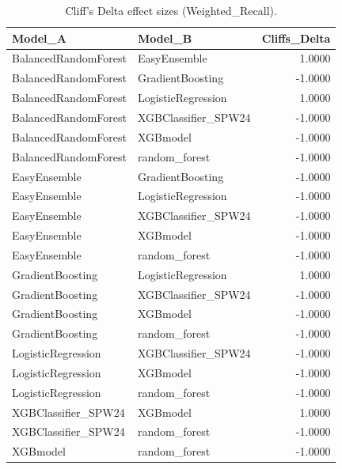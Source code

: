 \begin{table}[t]
\centering
\begin{tabular}{llr}
\toprule
Model_A & Model_B & Cliffs_Delta \\
\midrule
BalancedRandomForest & EasyEnsemble & 1.0000 \\
BalancedRandomForest & GradientBoosting & -1.0000 \\
BalancedRandomForest & LogisticRegression & 1.0000 \\
BalancedRandomForest & XGBClassifier_SPW24 & -1.0000 \\
BalancedRandomForest & XGBmodel & -1.0000 \\
BalancedRandomForest & random_forest & -1.0000 \\
EasyEnsemble & GradientBoosting & -1.0000 \\
EasyEnsemble & LogisticRegression & -1.0000 \\
EasyEnsemble & XGBClassifier_SPW24 & -1.0000 \\
EasyEnsemble & XGBmodel & -1.0000 \\
EasyEnsemble & random_forest & -1.0000 \\
GradientBoosting & LogisticRegression & 1.0000 \\
GradientBoosting & XGBClassifier_SPW24 & -1.0000 \\
GradientBoosting & XGBmodel & -1.0000 \\
GradientBoosting & random_forest & -1.0000 \\
LogisticRegression & XGBClassifier_SPW24 & -1.0000 \\
LogisticRegression & XGBmodel & -1.0000 \\
LogisticRegression & random_forest & -1.0000 \\
XGBClassifier_SPW24 & XGBmodel & 1.0000 \\
XGBClassifier_SPW24 & random_forest & -1.0000 \\
XGBmodel & random_forest & -1.0000 \\
\bottomrule
\end{tabular}
\caption{Cliff's Delta effect sizes (Weighted_Recall).}
\label{tab:cliffs_Weighted_Recall}
\end{table}